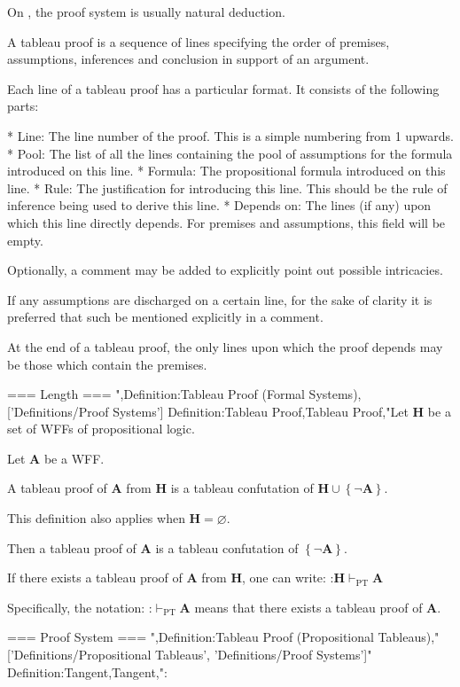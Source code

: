 On , the proof system is usually natural deduction.


A tableau proof is a sequence of lines specifying the order of premises, assumptions, inferences and conclusion in support of an argument.


Each line of a tableau proof has a particular format. It consists of the following parts:

* Line: The line number of the proof. This is a simple numbering from 1 upwards.
* Pool: The list of all the lines containing the pool of assumptions for the formula introduced on this line.
* Formula: The propositional formula introduced on this line.
* Rule: The justification for introducing this line. This should be the rule of inference being used to derive this line.
* Depends on: The lines (if any) upon which this line directly depends. For premises and assumptions, this field will be empty.


Optionally, a comment may be added to explicitly point out possible intricacies.

If any assumptions are discharged on a certain line, for the sake of clarity it is preferred that such be mentioned explicitly in a comment.


At the end of a tableau proof, the only lines upon which the proof depends may be those which contain the premises.


=== Length ===
",Definition:Tableau Proof (Formal Systems),['Definitions/Proof Systems']
Definition:Tableau Proof,Tableau Proof,"Let $\mathbf H$ be a set of WFFs of propositional logic.

Let $\mathbf A$ be a WFF.


A tableau proof of $\mathbf A$ from $\mathbf H$ is a tableau confutation of $\mathbf H \cup \left\lbrace \neg \mathbf A \right\rbrace$.


This definition also applies when $\mathbf H = \varnothing$.

Then a tableau proof of $\mathbf A$ is a tableau confutation of $\left\lbrace \neg \mathbf A \right\rbrace$.


If there exists a tableau proof of $\mathbf A$ from $\mathbf H$, one can write:
:$\mathbf H \vdash_{\mathrm{PT} } \mathbf A$

Specifically, the notation:
:$\vdash_{\mathrm{PT} } \mathbf A$
means that there exists a tableau proof of $\mathbf A$.


=== Proof System ===
",Definition:Tableau Proof (Propositional Tableaus),"['Definitions/Propositional Tableaus', 'Definitions/Proof Systems']"
Definition:Tangent,Tangent,":

